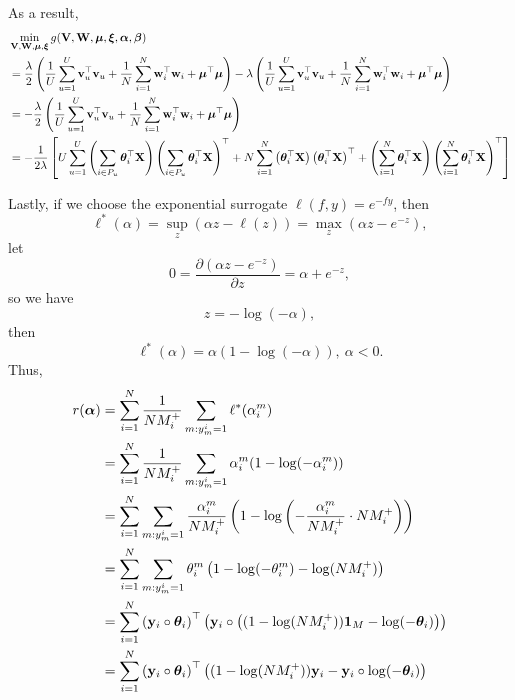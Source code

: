 As a result,
\begin{equation}
\label{eq:gmin}
\begin{aligned}
&\min_{\mathbf{V}, \mathbf{W}, \bm{\mu}, \bm{\xi}} g(\mathbf{V}, \mathbf{W}, \bm{\mu}, \bm{\xi}, {\bm{\alpha}}, {\bm{\beta}}) \\
&= \frac{\lambda}{2} \left( \frac{1}{U} \sum_{u=1}^U \mathbf{v}_u^\top \mathbf{v}_u 
     + \frac{1}{N} \sum_{i=1}^N \mathbf{w}_i^\top \mathbf{w}_i + \bm{\mu}^\top \bm{\mu} \right)
     -\lambda \left( \frac{1}{U} \sum_{u=1}^U \mathbf{v}_u^\top \mathbf{v}_u + \frac{1}{N} \sum_{i=1}^N \mathbf{w}_i^\top \mathbf{w}_i + \bm{\mu}^\top \bm{\mu} \right) \\
&= -\frac{\lambda}{2} \left( \frac{1}{U} \sum_{u=1}^U \mathbf{v}_u^\top \mathbf{v}_u + \frac{1}{N} \sum_{i=1}^N \mathbf{w}_i^\top \mathbf{w}_i + \bm{\mu}^\top \bm{\mu} \right) \\
&= -\frac{1}{2 \lambda} \left[
     U \sum_{u=1}^U \left( \sum_{i \in P_u} \bm{\theta}_i^\top \mathbf{X} \right) \left( \sum_{i \in P_u} \bm{\theta}_i^\top \mathbf{X} \right)^\top
   + N \sum_{i=1}^N \left( \bm{\theta}_i^\top \mathbf{X} \right) \left( \bm{\theta}_i^\top \mathbf{X} \right)^\top
   + \left( \sum_{i=1}^N \bm{\theta}_i^\top \mathbf{X} \right) \left( \sum_{i=1}^N \bm{\theta}_i^\top \mathbf{X} \right)^\top \right]
\end{aligned}
\end{equation}

Lastly, if we choose the exponential surrogate $\ell(f, y) = e^{-fy}$, then
\begin{equation*}
\ell^*(\alpha) = \sup_z \left(\alpha z - \ell(z) \right) = \max_z \left(\alpha z - e^{-z} \right),
\end{equation*}
let 
\begin{equation*}
0 = \frac{\partial (\alpha z - e^{-z})}{\partial z} = \alpha + e^{-z},
\end{equation*}
so we have
\begin{equation*}
z = -\log(-\alpha),
\end{equation*}
then
\begin{equation*}
\ell^*(\alpha) = \alpha ( 1 - \log(-\alpha) ), \ \alpha < 0.
\end{equation*}
Thus,
\begin{equation}
\label{eq:expconj}
\begin{aligned}
r({\bm{\alpha}})
&= \sum_{i=1}^N \frac{1}{N M_i^+} \sum_{m: y_m^i = 1} \ell^*(\alpha_i^m) \\
&= \sum_{i=1}^N \frac{1}{N M_i^+} \sum_{m: y_m^i = 1} \alpha_i^m (1 - \log(-\alpha_i^m)) \\
&= \sum_{i=1}^N \sum_{m: y_m^i = 1} \frac{\alpha_i^m}{N M_i^+} \left(1 - \log \left( -\frac{\alpha_i^m}{N M_i^+} \cdot N M_i^+ \right) \right) \\
&= \sum_{i=1}^N \sum_{m: y_m^i = 1} \theta_i^m \left(1 - \log(-\theta_i^m) - \log(N M_i^+) \right) \\
&= \sum_{i=1}^N \left( \mathbf{y}_i \circ \bm{\theta}_i \right)^\top 
                \left( \mathbf{y}_i \circ \left( (1 - \log(N M_i^+)) \mathbf{1}_M - \log(-\bm{\theta}_i) \right) \right) \\
&= \sum_{i=1}^N \left( \mathbf{y}_i \circ \bm{\theta}_i \right)^\top 
                \left( (1 - \log(N M_i^+)) \mathbf{y}_i - \mathbf{y}_i \circ \log(-\bm{\theta}_i) \right)
\end{aligned}
\end{equation}

